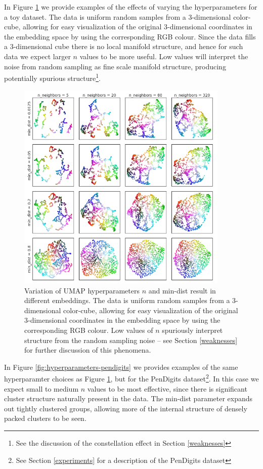 \documentclass[12pt]{article}
\begin{document}
In Figure \ref{fig:hyperparameters} we provide examples of the effects of varying the hyperparameters for a toy dataset. The data is uniform random samples from a 3-dimensional color-cube, allowing for easy visualization of the original 3-dimensional coordinates in the embedding space by using the corresponding RGB colour. Since the data fills a 3-dimensional cube there is no local manifold structure, and hence for such data we expect larger $n$ values to be more useful. Low values will interpret the noise from random sampling as fine scale manifold structure, producing potentially spurious structure\footnote{See the discussion of the constellation effect in Section \ref{weaknesses}}.

\begin{figure}
    \centering
    \includegraphics[width=0.9\textwidth]{hyperparameters.png}
    \caption{Variation of UMAP hyperparameters $n$ and min-dist result in different embeddings. The data is uniform random samples from a 3-dimensional color-cube, allowing for easy visualization of the original 3-dimensional coordinates in the embedding space by using the corresponding RGB colour. Low values of $n$ spuriously interpret structure from the random sampling noise -- see Section \ref{weaknesses} for further discussion of this phenomena.}
    \label{fig:hyperparameters}
\end{figure}

In Figure \ref{fig:hyperparameters-pendigits} we provides examples of the same hyperparamter choices as Figure \ref{fig:hyperparameters}, but for the PenDigits dataset\footnote{See Section \ref{experiments} for a description of the PenDigits dataset}. In this case we expect small to medium $n$ values to be most effective, since there is significant cluster structure naturally present in the data. The min-dist parameter expands out tightly clustered groups, allowing more of the internal structure of densely packed clusters to be seen.
\end{document}
